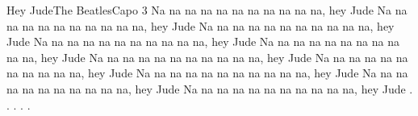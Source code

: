 \begin{song}{Hey Jude}{The Beatles}{Capo 3}
\newpage
{}
Na na na na na na na na na na na, hey Jude
Na na na na na na na na na na na, hey Jude
Na na na na na na na na na na na, hey Jude
Na na na na na na na na na na na, hey Jude
Na na na na na na na na na na na, hey Jude
Na na na na na na na na na na na, hey Jude
Na na na na na na na na na na na, hey Jude
Na na na na na na na na na na na, hey Jude
Na na na na na na na na na na na, hey Jude
Na na na na na na na na na na na, hey Jude . . . . .
\end{song}